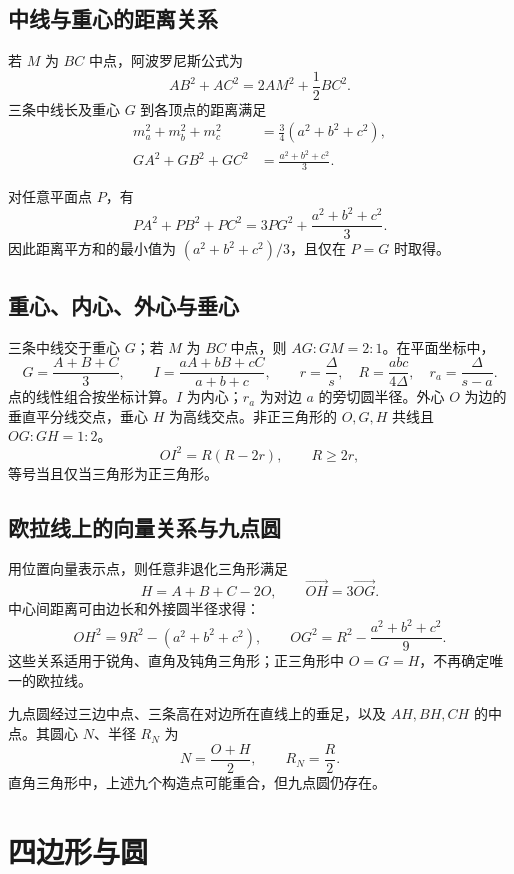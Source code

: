 \documentclass[../main.tex]{subfiles}
\begin{document}
\subsection{中线与重心的距离关系}
若 $M$ 为 $BC$ 中点，阿波罗尼斯公式为
\[
AB^2+AC^2=2AM^2+\frac12BC^2.
\]
三条中线长及重心 $G$ 到各顶点的距离满足
\begin{align*}
m_a^2+m_b^2+m_c^2&=\frac34(a^2+b^2+c^2),\\
GA^2+GB^2+GC^2&=\frac{a^2+b^2+c^2}{3}.
\end{align*}
\par\begin{samepage}
对任意平面点 $P$，有
\[
PA^2+PB^2+PC^2=3PG^2+\frac{a^2+b^2+c^2}{3}.
\]
因此距离平方和的最小值为 $(a^2+b^2+c^2)/3$，且仅在 $P=G$ 时取得。
\par\end{samepage}
\subsection{重心、内心、外心与垂心}
三条中线交于重心 $G$；若 $M$ 为 $BC$ 中点，则 $AG:GM=2:1$。在平面坐标中，
\[
G=\frac{A+B+C}{3},\qquad
I=\frac{aA+bB+cC}{a+b+c},\qquad
r=\frac\Delta s,\quad R=\frac{abc}{4\Delta},\quad r_a=\frac\Delta{s-a}.
\]
点的线性组合按坐标计算。$I$ 为内心；$r_a$ 为对边 $a$ 的旁切圆半径。外心 $O$ 为边的垂直平分线交点，垂心 $H$ 为高线交点。非正三角形的 $O,G,H$ 共线且 $OG:GH=1:2$。
\[
OI^2=R(R-2r),\qquad R\ge2r,
\]
等号当且仅当三角形为正三角形。
\subsection{欧拉线上的向量关系与九点圆}
用位置向量表示点，则任意非退化三角形满足
\[
H=A+B+C-2O,\qquad \overrightarrow{OH}=3\overrightarrow{OG}.
\]
中心间距离可由边长和外接圆半径求得：
\[
OH^2=9R^2-(a^2+b^2+c^2),\qquad
OG^2=R^2-\frac{a^2+b^2+c^2}{9}.
\]
这些关系适用于锐角、直角及钝角三角形；正三角形中 $O=G=H$，不再确定唯一的欧拉线。
\par\begin{samepage}
九点圆经过三边中点、三条高在对边所在直线上的垂足，以及 $AH,BH,CH$ 的中点。其圆心 $N$、半径 $R_N$ 为
\[
N=\frac{O+H}{2},\qquad R_N=\frac R2.
\]
直角三角形中，上述九个构造点可能重合，但九点圆仍存在。
\par\end{samepage}
\section{四边形与圆}
\end{document}
